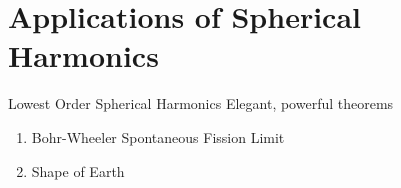 % 

\section{Applications of Spherical Harmonics}
\begin{frame}{Lowest Order Spherical Harmonics}
Elegant, powerful theorems
\begin{enumerate}
	\item Bohr-Wheeler Spontaneous Fission Limit
	\item Shape of Earth
\end{enumerate}
\end{frame}

	

\endinput  %
